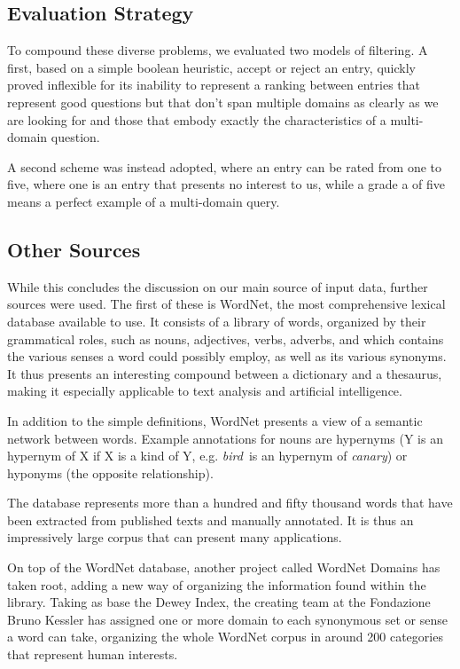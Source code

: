 
\subsection{Evaluation Strategy} %
\label{sub:evaluation_strategy}

To compound these diverse problems, we evaluated two models of filtering. A first, based on a simple boolean heuristic, accept or reject an entry, quickly proved inflexible for its inability to represent a ranking between entries that represent good questions but that don't span multiple domains as clearly as we are looking for and those that embody exactly the characteristics of a multi-domain question.

A second scheme was instead adopted, where an entry can be rated from one to five, where one is an entry that presents no interest to us, while a grade a of five means a perfect example of a multi-domain query.


\subsection{Other Sources} %
\label{sub:other_sources}

While this concludes the discussion on our main source of input data, further sources were used. The first of these is WordNet, the most comprehensive lexical database available to use. It consists of a library of words, organized by their grammatical roles, such as nouns, adjectives, verbs, adverbs, and which contains the various senses a word could possibly employ, as well as its various synonyms. It thus presents an interesting compound between a dictionary and a thesaurus, making it especially applicable to text analysis and artificial intelligence.

In addition to the simple definitions, WordNet presents a view of a semantic network between words. Example annotations for nouns are hypernyms (Y is an hypernym of X if X is a kind of Y, e.g. \emph{bird}\ is an hypernym of \emph{canary}) or hyponyms (the opposite relationship).

The database represents more than a hundred and fifty thousand words that have been extracted from published texts and manually annotated. It is thus an impressively large corpus that can present many applications.

On top of the WordNet database, another project called WordNet Domains has taken root, adding a new way of organizing the information found within the library. Taking as base the Dewey Index, the creating team at the Fondazione Bruno Kessler has assigned one or more domain to each synonymous set or sense a word can take, organizing the whole WordNet corpus in around 200 categories that represent human interests.


